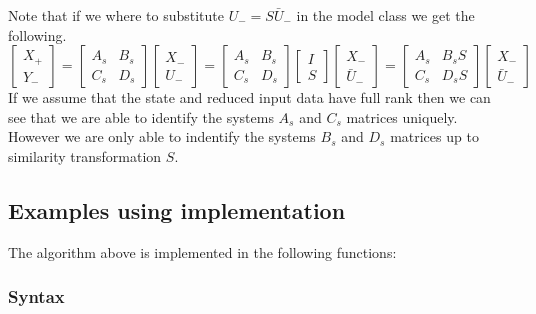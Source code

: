 Note that if we where to substitute $U_- = S\bar{U}_-$ in the model class we get the following.
\[ \begin{bmatrix} X_{+} \\ Y_{-} \end{bmatrix} = 
\begin{bmatrix} A_s & B_s \\ C_s & D_s \end{bmatrix} 
\begin{bmatrix} X_{-} \\ U_{-} \end{bmatrix} = 
\begin{bmatrix} A_s & B_s \\ C_s & D_s \end{bmatrix} 
\begin{bmatrix} I \\ S \end{bmatrix}
\begin{bmatrix} X_{-} \\ \bar{U}_{-} \end{bmatrix} = 
\begin{bmatrix} A_s & B_sS \\ C_s & D_sS \end{bmatrix} 
\begin{bmatrix} X_{-} \\ \bar{U}_{-} \end{bmatrix}
 \]
If we assume that the state and reduced input data have full rank then we can see that we are able to identify the systems $A_s$ and $C_s$ matrices uniquely. However we are only able to indentify the systems $B_s$ and $D_s$ matrices up to similarity transformation $S$.

\subsection{Examples using implementation}
The algorithm above is implemented in the following functions:
\subsubsection*{Syntax} 
 \\
 \\

